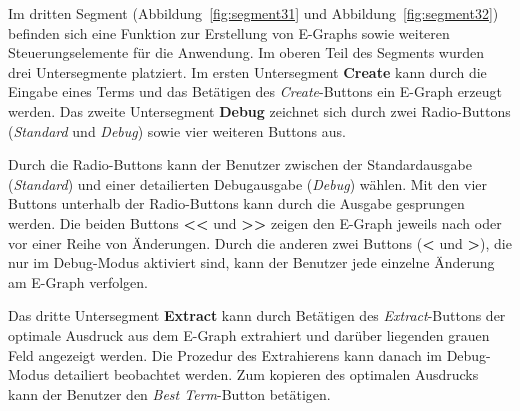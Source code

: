 Im dritten Segment (Abbildung~\ref{fig:segment31} und Abbildung~\ref{fig:segment32}) befinden sich eine Funktion zur Erstellung von E-Graphs sowie weiteren Steuerungselemente für die Anwendung.
Im oberen Teil des Segments wurden drei Untersegmente platziert. Im ersten Untersegment \textbf{Create} kann durch die Eingabe eines Terms und das Betätigen des \textit{Create}-Buttons
ein E-Graph erzeugt werden. Das zweite Untersegment \textbf{Debug} zeichnet sich durch zwei Radio-Buttons (\textit{Standard} und \textit{Debug}) sowie vier weiteren Buttons aus. 

Durch die Radio-Buttons kann der Benutzer zwischen der Standardausgabe (\textit{Standard}) und einer detailierten Debugausgabe (\textit{Debug}) wählen.
Mit den vier Buttons unterhalb der Radio-Buttons kann durch die Ausgabe gesprungen werden. Die beiden Buttons \textbf{<<} und \textbf{>>} zeigen den E-Graph jeweils nach oder vor einer 
Reihe von Änderungen. Durch die anderen zwei Buttons (\textbf{<} und \textbf{>}), die nur im Debug-Modus aktiviert sind, kann der Benutzer jede einzelne Änderung am E-Graph verfolgen. 

Das dritte Untersegment \textbf{Extract} kann durch Betätigen des \textit{Extract}-Buttons der optimale Ausdruck aus dem E-Graph extrahiert und darüber liegenden grauen Feld angezeigt werden.
Die Prozedur des Extrahierens kann danach im Debug-Modus detailiert beobachtet werden. Zum kopieren des optimalen Ausdrucks kann der Benutzer den \textit{Best Term}-Button betätigen.


